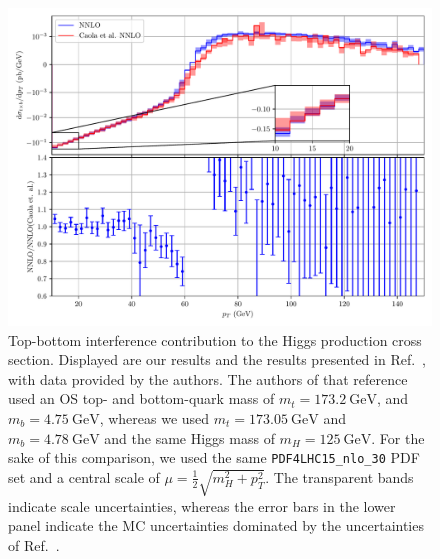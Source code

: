 \begin{figure}[ht]
\centering
\includegraphics[width=\figurewidth]{Images/Caola_comparison}
\caption{Top-bottom interference contribution to the Higgs production cross section. Displayed are our results and the results presented in Ref.~\cite{Caola:2018zye}, with data provided by the authors. The authors of that reference used an \acs{OS} top- and bottom-quark mass of $m_t = 173.2\ \mathrm{GeV}$, and $m_b = 4.75\ \mathrm{GeV}$, whereas we used $m_t = 173.05\ \mathrm{GeV}$ and $m_b = 4.78\ \mathrm{GeV}$ and the same Higgs mass of $m_H = 125\ \mathrm{GeV}$. For the sake of this comparison, we used the same \texttt{PDF4LHC15\_nlo\_30} \acs{PDF} set and a central scale of $\mu = \frac{1}{2}\sqrt{m_H^2 + p_T^2}$. The transparent bands indicate scale uncertainties, whereas the error bars in the lower panel indicate the \acs{MC} uncertainties dominated by the uncertainties of Ref.~\cite{Caola:2018zye}.}
\label{fig:6:caola_comparison}
\end{figure}

